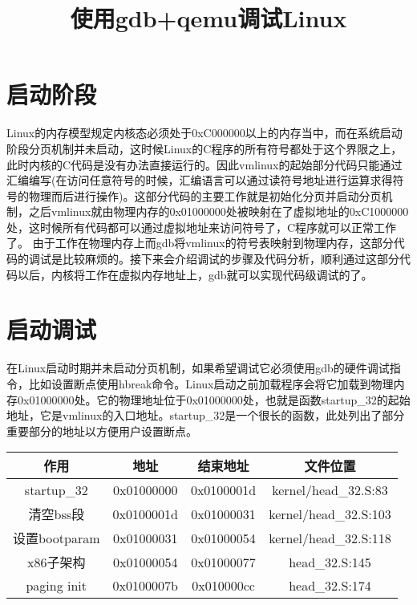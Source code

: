 \documentclass[b5paper,9pt,twoside,openany]{article}
\begin{document}
\title{使用gdb+qemu调试Linux}
\maketitle
\section{启动阶段} 
Linux的内存模型规定内核态必须处于0xC000000以上的内存当中，而在系统启动阶段分页机制并未启动，这时候Linux的C程序的所有符号都处于这个界限之上，此时内核的C代码是没有办法直接运行的。因此vmlinux的起始部分代码只能通过汇编编写(在访问任意符号的时候，汇编语言可以通过读符号地址进行运算求得符号的物理而后进行操作)。这部分代码的主要工作就是初始化分页并启动分页机制，之后vmlinux就由物理内存的0x01000000处被映射在了虚拟地址的0xC1000000处，这时候所有代码都可以通过虚拟地址来访问符号了，C程序就可以正常工作了。
由于工作在物理内存上而gdb将vmlinux的符号表映射到物理内存，这部分代码的调试是比较麻烦的。接下来会介绍调试的步骤及代码分析，顺利通过这部分代码以后，内核将工作在虚拟内存地址上，gdb就可以实现代码级调试的了。

\section{启动调试}
在Linux启动时期并未启动分页机制，如果希望调试它必须使用gdb的硬件调试指令，比如设置断点使用hbreak命令。Linux启动之前加载程序会将它加载到物理内存0x01000000处。它的物理地址位于0x01000000处，也就是函数startup\_32的起始地址，它是vmlinux的入口地址。startup\_32是一个很长的函数，此处列出了部分重要部分的地址以方便用户设置断点。

\begin{tabular}{|c|c|c|c|}
\hline
作用  & 地址 & 结束地址 & 文件位置 \\
\hline
startup\_32 & 0x01000000 & 0x0100001d & kernel/head\_32.S:83 \\
\hline
清空bss段 & 0x0100001d & 0x01000031 & kernel/head\_32.S:103 \\
\hline
设置bootparam & 0x01000031 & 0x01000054 & kernel/head\_32.S:118 \\
\hline
x86子架构 & 0x01000054 & 0x01000077 & head\_32.S:145 \\
\hline
paging init & 0x0100007b & 0x010000cc & head\_32.S:174 \\
\hline
\end{tabular}
\end{document}
